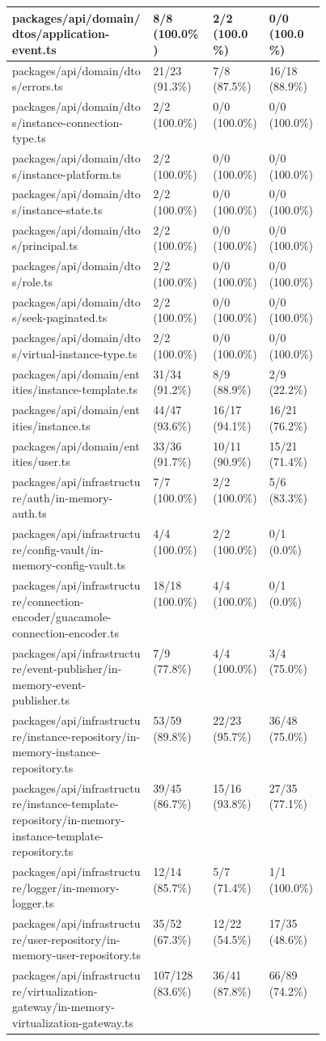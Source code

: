 \begin{longtable}{@{\extracolsep{\fill}}p{0.45\linewidth}lll}
packages/api/domain/dtos/application-event.ts & 8/8 (100.0\%) & 2/2 (100.0\%) & 0/0 (100.0\%) \\ \hline
packages/api/domain/dtos/errors.ts & 21/23 (91.3\%) & 7/8 (87.5\%) & 16/18 (88.9\%) \\ \hline
packages/api/domain/dtos/instance-connection-type.ts & 2/2 (100.0\%) & 0/0 (100.0\%) & 0/0 (100.0\%) \\ \hline
packages/api/domain/dtos/instance-platform.ts & 2/2 (100.0\%) & 0/0 (100.0\%) & 0/0 (100.0\%) \\ \hline
packages/api/domain/dtos/instance-state.ts & 2/2 (100.0\%) & 0/0 (100.0\%) & 0/0 (100.0\%) \\ \hline
packages/api/domain/dtos/principal.ts & 2/2 (100.0\%) & 0/0 (100.0\%) & 0/0 (100.0\%) \\ \hline
packages/api/domain/dtos/role.ts & 2/2 (100.0\%) & 0/0 (100.0\%) & 0/0 (100.0\%) \\ \hline
packages/api/domain/dtos/seek-paginated.ts & 2/2 (100.0\%) & 0/0 (100.0\%) & 0/0 (100.0\%) \\ \hline
packages/api/domain/dtos/virtual-instance-type.ts & 2/2 (100.0\%) & 0/0 (100.0\%) & 0/0 (100.0\%) \\ \hline
packages/api/domain/entities/instance-template.ts & 31/34 (91.2\%) & 8/9 (88.9\%) & 2/9 (22.2\%) \\ \hline
packages/api/domain/entities/instance.ts & 44/47 (93.6\%) & 16/17 (94.1\%) & 16/21 (76.2\%) \\ \hline
packages/api/domain/entities/user.ts & 33/36 (91.7\%) & 10/11 (90.9\%) & 15/21 (71.4\%) \\ \hline
packages/api/infrastructure/auth/in-memory-auth.ts & 7/7 (100.0\%) & 2/2 (100.0\%) & 5/6 (83.3\%) \\ \hline
packages/api/infrastructure/config-vault/in-memory-config-vault.ts & 4/4 (100.0\%) & 2/2 (100.0\%) & 0/1 (0.0\%) \\ \hline
packages/api/infrastructure/connection-encoder/guacamole-connection-encoder.ts & 18/18 (100.0\%) & 4/4 (100.0\%) & 0/1 (0.0\%) \\ \hline
packages/api/infrastructure/event-publisher/in-memory-event-publisher.ts & 7/9 (77.8\%) & 4/4 (100.0\%) & 3/4 (75.0\%) \\ \hline
packages/api/infrastructure/instance-repository/in-memory-instance-repository.ts & 53/59 (89.8\%) & 22/23 (95.7\%) & 36/48 (75.0\%) \\ \hline
packages/api/infrastructure/instance-template-repository/in-memory-instance-template-repository.ts & 39/45 (86.7\%) & 15/16 (93.8\%) & 27/35 (77.1\%) \\ \hline
packages/api/infrastructure/logger/in-memory-logger.ts & 12/14 (85.7\%) & 5/7 (71.4\%) & 1/1 (100.0\%) \\ \hline
packages/api/infrastructure/user-repository/in-memory-user-repository.ts & 35/52 (67.3\%) & 12/22 (54.5\%) & 17/35 (48.6\%) \\ \hline
packages/api/infrastructure/virtualization-gateway/in-memory-virtualization-gateway.ts & 107/128 (83.6\%) & 36/41 (87.8\%) & 66/89 (74.2\%) \\



\end{longtable}

